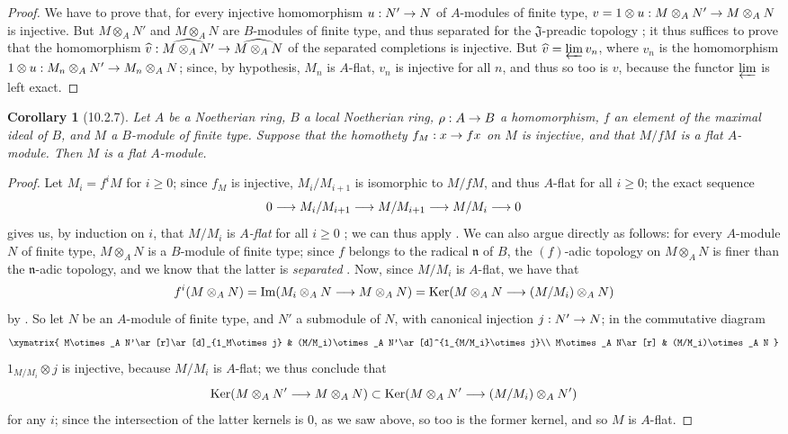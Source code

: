 \documentclass[oneside]{amsart}
\theoremstyle{ega-env-style}
\theoremstyle{ega-thm-env-style}
\newtheorem*{corollary}{Corollary}
\theoremstyle{ega-defn-env-style}
\def\geq{\geqslant}                 %
\def\Ker{\operatorname{Ker}}
\def\Im{\operatorname{Im}}
\renewcommand{\to}{\mathchoice{\longrightarrow}{\rightarrow}{\rightarrow}{\rightarrow}}
\newcommand{\oldpage}[2][]{{\marginnote{\normalfont{\textbf{#1}~|~#2}}}\ignorespaces}
\let\EGAOriginalLabel\label
\renewcommand{\label}[1]{\phantomsection\EGAOriginalLabel{#1}}
\begin{document}
\begin{proof}
We have to prove that, for every injective homomorphism $u:N'\to N$ of $A$-modules of finite type, $v=1\otimes u:M\otimes_A N'\to M\otimes_A N$ is injective.
But $M\otimes_A N'$ and $M\otimes_A N$ are $B$-modules of finite type, and thus separated for the $\mathfrak{J}$-preadic topology ;
it thus suffices to prove that the homomorphism $\widehat{v}:\widehat{M\otimes_A N'}\to\widehat{M\otimes_A N}$ of the separated completions is injective.
But $\widehat{v}=\varprojlim v_n$, where $v_n$ is the homomorphism $1\otimes u:M_n\otimes_A N'\to M_n\otimes_A N$;
since, by hypothesis, $M_n$ is $A$-flat, $v_n$ is injective for all $n$, and thus so too is $v$, because the functor $\varprojlim$ is left exact.
\end{proof}

\begin{corollary}[10.2.7]
\label{0.10.2.7}
Let $A$ be a Noetherian ring, $B$ a local Noetherian ring, $\rho:A\to B$ a homomorphism, $f$ an element of the maximal ideal of $B$, and $M$ a $B$-module of finite type.
Suppose that the homothety $f_M:x\to fx$ on $M$ is injective, and that $M/fM$ is a flat $A$-module.
Then $M$ is a flat $A$-module.
\end{corollary}

\begin{proof}
Let $M_i=f^iM$ for $i\geq0$;
since $f_M$ is injective, $M_i/M_{i+1}$ is isomorphic to $M/fM$, and thus $A$-flat for all $i\geq0$;
the exact sequence
\[
  0\to M_i/M_{i+1}\to M/M_{i+1}\to M/M_i\to 0
\]
gives us, by induction on $i$, that $M/M_i$ is \emph{$A$-flat} for all $i\geq0$ ;
we can thus apply .
We can also argue directly as follows:
for every $A$-module $N$ of finite type, $M\otimes_A N$ is a $B$-module of finite type;
since $f$ belongs to the radical $\mathfrak{n}$ of $B$, the $(f)$-adic topology on $M\otimes_A N$ is finer than the
\oldpage[0\textsubscript{III-1}]{20}
$\mathfrak{n}$-adic topology, and we know that the latter is \emph{separated} .
Now, since $M/M_i$ is $A$-flat, we have that
\[
  f^i(M\otimes_A N)=\Im(M_i\otimes_A N\to M\otimes_A N)=\Ker(M\otimes_A N\to(M/M_i)\otimes_A N)
\]
by .
So let $N$ be an $A$-module of finite type, and $N'$ a submodule of $N$, with canonical injection $j:N'\to N$; in the commutative diagram
\[
  \xymatrix{
    M\otimes_A N'\ar[r]\ar[d]_{1_M\otimes j} &
    (M/M_i)\otimes_A N'\ar[d]^{1_{M/M_i}\otimes j}\\
    M\otimes_A N\ar[r] &
    (M/M_i)\otimes_A N
  }
\]
$1_{M/M_i}\otimes j$ is injective, because $M/M_i$ is $A$-flat; we thus conclude that
\[
  \Ker(M\otimes_A N'\to M\otimes_A N)\subset\Ker(M\otimes_A N'\to(M/M_i)\otimes_A N')
\]
for any $i$; since the intersection of the latter kernels is $0$, as we saw above, so too is the former kernel, and so $M$ is $A$-flat.
\end{proof}
\end{document}

